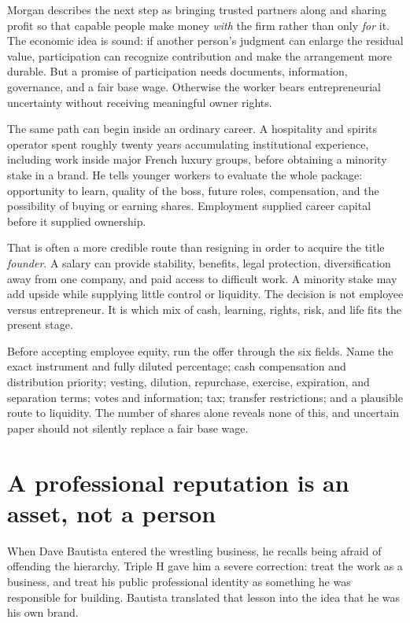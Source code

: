 Morgan describes the next step as bringing trusted partners along and sharing
profit so that capable people make money \emph{with} the firm rather than only
\emph{for} it. The economic idea is sound: if another person's judgment can
enlarge the residual value, participation can recognize contribution and make
the arrangement more durable. But a promise of participation needs documents,
information, governance, and a fair base wage. Otherwise the worker bears
entrepreneurial uncertainty without receiving meaningful owner rights.

The same path can begin inside an ordinary career. A hospitality and spirits
operator spent roughly twenty years accumulating institutional experience,
including work inside major French luxury groups, before obtaining a minority
stake in a brand. He tells younger workers to evaluate the whole package:
opportunity to learn, quality of the boss, future roles, compensation, and the
possibility of buying or earning shares. Employment supplied career capital
before it supplied ownership.

That is often a more credible route than resigning in order to acquire the
title \emph{founder}. A salary can provide stability, benefits, legal
protection, diversification away from one company, and paid access to difficult
work. A minority stake may add upside while supplying little control or
liquidity. The decision is not employee versus entrepreneur. It is which mix of
cash, learning, rights, risk, and life fits the present stage.

Before accepting employee equity, run the offer through the six fields. Name
the exact instrument and fully diluted percentage; cash compensation and
distribution priority; vesting, dilution, repurchase, exercise, expiration,
and separation terms; votes and information; tax; transfer restrictions; and
a plausible route to liquidity. The number of shares alone reveals none of
this, and uncertain paper should not silently replace a fair base wage.

\section{A professional reputation is an asset, not a person}

When Dave Bautista entered the wrestling business, he recalls being afraid of
offending the hierarchy. Triple H gave him a severe correction: treat the work
as a business, and treat his public professional identity as something he was
responsible for building. Bautista translated that lesson into the idea that
he was his own brand.

